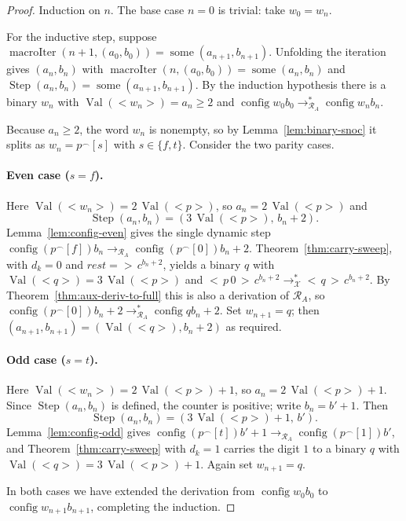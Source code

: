 \documentclass[11pt,a4paper]{article}
\theoremstyle{definition}
\newcommand{\lt}{<}
\newcommand{\gt}{>}
\newcommand{\val}{\operatorname{Val}}
\newcommand{\conc}{{^\frown}}
\newcommand{\config}{\operatorname{config}}
\newcommand{\auxRules}{\mathcal{X}}
\newcommand{\antihydraSRS}{\mathcal{R}_{A}}
\newcommand{\macroStep}{\operatorname{Step}}
\newcommand{\some}{\operatorname{some}}
\newcommand{\macroIter}{\operatorname{macroIter}}
\begin{document}
\begin{proof}
Induction on $n$.  The base case $n=0$ is trivial: take $w_0=w_n$.

For the inductive step, suppose
$\macroIter(n+1,(a_0,b_0))=\some(a_{n+1},b_{n+1})$.  Unfolding the
iteration gives $(a_n,b_n)$ with
$\macroIter(n,(a_0,b_0))=\some(a_n,b_n)$ and
$\macroStep(a_n,b_n)=\some(a_{n+1},b_{n+1})$.  By the induction
hypothesis there is a binary $w_n$ with $\val(\lt w_n\gt)=a_n\ge2$ and
$\config{w_0}{b_0}\to^{*}_{\antihydraSRS}\config{w_n}{b_n}$.

Because $a_n\ge2$, the word $w_n$ is nonempty, so by
Lemma~\ref{lem:binary-snoc} it splits as $w_n=p\conc[s]$ with
$s\in\{f,t\}$.  Consider the two parity cases.

\paragraph{Even case ($s=f$).}  Here
$\val(\lt w_n\gt)=2\,\val(\lt p\gt)$, so $a_n=2\,\val(\lt p\gt)$ and
\[
  \macroStep(a_n,b_n)=(3\,\val(\lt p\gt),\,b_n+2).
\]
Lemma~\ref{lem:config-even} gives the single dynamic step
$\config{(p\conc[f])}{b_n}\to_{\antihydraSRS}\config{(p\conc[0])}{b_n+2}$.
Theorem~\ref{thm:carry-sweep}, with $d_k=0$ and
$\textit{rest}=\gt\,c^{b_n+2}$, yields a binary $q$ with
$\val(\lt q\gt)=3\,\val(\lt p\gt)$ and
$\lt\,p\,0\,\gt\,c^{b_n+2}\to^{*}_{\auxRules}\lt\,q\,\gt\,c^{b_n+2}$.
By Theorem~\ref{thm:aux-deriv-to-full} this is also a derivation of
$\antihydraSRS$, so
$\config{(p\conc[0])}{b_n+2}\to^{*}_{\antihydraSRS}\config{q}{b_n+2}$.
Set $w_{n+1}=q$; then $(a_{n+1},b_{n+1})=(\val(\lt q\gt),b_n+2)$ as
required.

\paragraph{Odd case ($s=t$).}  Here
$\val(\lt w_n\gt)=2\,\val(\lt p\gt)+1$, so $a_n=2\,\val(\lt p\gt)+1$.
Since $\macroStep(a_n,b_n)$ is defined, the counter is positive; write
$b_n=b'+1$.  Then
\[
  \macroStep(a_n,b_n)=(3\,\val(\lt p\gt)+1,\,b').
\]
Lemma~\ref{lem:config-odd} gives
$\config{(p\conc[t])}{b'+1}\to_{\antihydraSRS}\config{(p\conc[1])}{b'}$,
and Theorem~\ref{thm:carry-sweep} with $d_k=1$ carries the digit $1$ to a
binary $q$ with $\val(\lt q\gt)=3\,\val(\lt p\gt)+1$.  Again set
$w_{n+1}=q$.

In both cases we have extended the derivation from $\config{w_0}{b_0}$ to
$\config{w_{n+1}}{b_{n+1}}$, completing the induction.
\end{proof}
\end{document}
